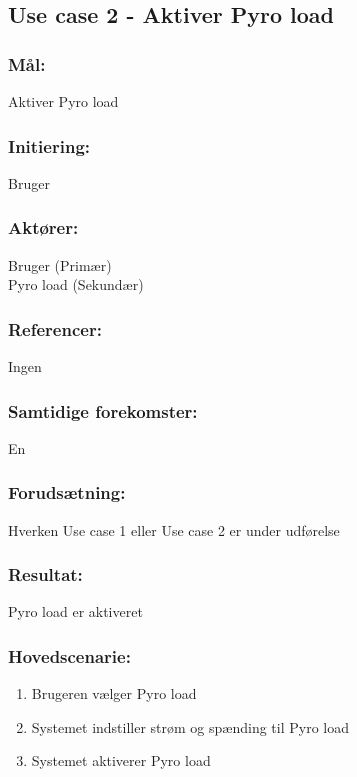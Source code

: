 \clearpage

\begin{framed}
	\subsection{Use case 2 - Aktiver Pyro load}
	
	\subsubsection*{Mål:}
	Aktiver Pyro load
	
	\subsubsection*{Initiering:}
	Bruger
	
	\subsubsection*{Aktører:}
	Bruger (Primær)\\ \indent
	Pyro load (Sekundær)
	
	\subsubsection*{Referencer:}
	Ingen
	
	\subsubsection*{Samtidige forekomster:}
	En
	
	\subsubsection*{Forudsætning:}
	Hverken Use case 1 eller Use case 2 er under udførelse
	
	\subsubsection*{Resultat:}
	Pyro load er aktiveret
	
	\subsubsection*{Hovedscenarie:}
	\begin{enumerate}
		\item Brugeren vælger Pyro load
		\item Systemet indstiller strøm og spænding til Pyro load %
		\item Systemet aktiverer Pyro load
	\end{enumerate}

\end{framed}

